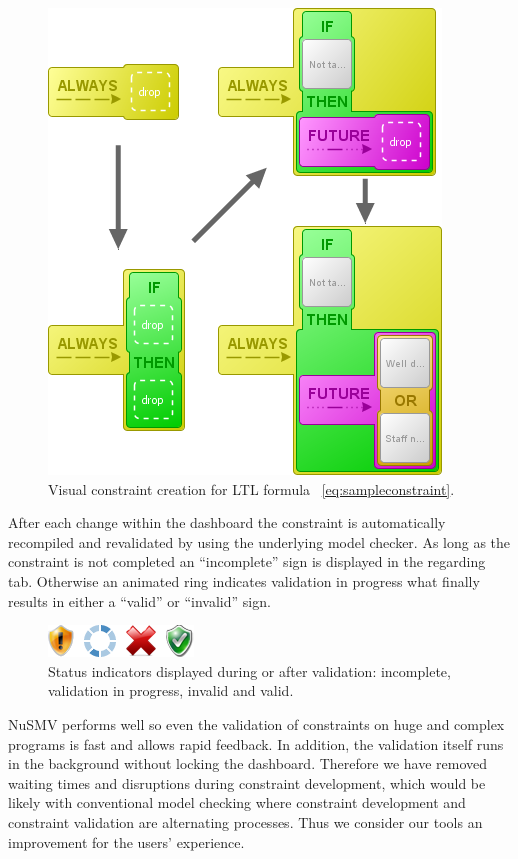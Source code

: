 \documentclass[conference]{IEEEtran}
\begin{document}
\begin{figure}[htbp]
  \centering
  \includegraphics[scale=0.5]{sampleconstraint}
  \caption{Visual constraint creation for LTL formula ~\ref{eq:sampleconstraint}.}
  \label{fig:sampleconstraint}
\end{figure}

After each change within the dashboard the constraint is automatically recompiled and revalidated by using the underlying model checker. As long as the constraint is not completed an ``incomplete'' sign is displayed in the regarding tab. Otherwise an animated ring indicates validation in progress what finally results in either a ``valid'' or ``invalid'' sign.

\begin{figure}[htbp]
  \centering
  \includegraphics[scale=0.5]{results}
  \caption{Status indicators displayed during or after validation: incomplete, validation in progress, invalid and valid.}
  \label{fig:results}
\end{figure}

NuSMV performs well so even the validation of constraints on huge and complex programs is fast and allows rapid feedback. In addition, the validation itself runs in the background without locking the dashboard. Therefore we have removed waiting times and disruptions during constraint development, which would be likely with conventional model checking where constraint development and constraint validation are alternating processes. Thus we consider our tools an improvement for the users' experience.
\end{document}
